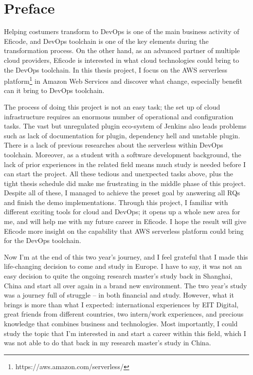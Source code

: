 \chapter*{Preface}
Helping costumers transform to DevOps is one of the main business activity of Eficode, and DevOps toolchain is one of the key elements during the transformation process.
On the other hand, as an advanced partner of multiple cloud providers, Eficode is interested in what cloud technologies could bring to the DevOps toolchain. In this thesis project, I focus on the AWS serverless platform\footnote{https://aws.amazon.com/serverless/} in Amazon Web Services and discover what change, especially benefit can it bring to DevOps toolchain.

The process of doing this project is not an easy task; the set up of cloud infrastructure requires an enormous number of operational and configuration tasks. The vast but unregulated plugin eco-system of Jenkins also leads problems such as lack of documentation for plugin, dependency hell and unstable plugin. There is a lack of previous researches about the serverless within DevOps toolchain. Moreover, as a student with a software development background, the lack of prior experiences in the related field means much study is needed before I can start the project. All these tedious and unexpected tasks above, plus the tight thesis schedule did make me frustrating in the middle phase of this project. Despite all of these, I managed to achieve the preset goal by answering all RQs and finish the demo implementations. Through this project, I familiar with different exciting tools for cloud and DevOps; it opens up a whole new area for me, and will help me with my future career in Eficode. I hope the result will give Eficode more insight on the capability that AWS serverless platform could bring for the DevOps toolchain.
\vspace{1\baselineskip}

\noindent
Now I'm at the end of this two year's journey, and I feel grateful that I made this life-changing decision to come and study in Europe. I have to say, it was not an easy decision to quite the ongoing research master's study back in Shanghai, China and start all over again in a brand new environment. The two year's study was a journey full of struggle -- in both financial and study. However, what it brings is more than what I expected: international experiences by EIT Digital, great friends from different countries, two intern/work experiences, and precious knowledge that combines business and technologies. Most importantly, I could study the topic that I'm interested in and start a career within this field, which I was not able to do that back in my research master's study in China.

